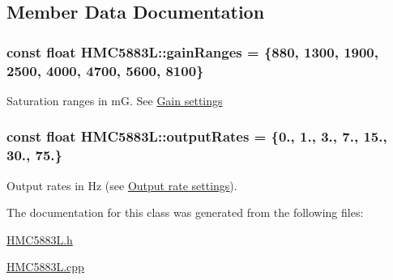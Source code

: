 \subsection{Member Data Documentation}
\hypertarget{class_h_m_c5883_l_a631541baef14a0c965430a685ca14504}{
\subsubsection[{gain\+Ranges}]{\setlength{\rightskip}{0pt plus 5cm}const float H\+M\+C5883\+L\+::gain\+Ranges = \{880, 1300, 1900, 2500, 4000, 4700, 5600, 8100\}\hspace{0.3cm}{\ttfamily [static]}}}\label{class_h_m_c5883_l_a631541baef14a0c965430a685ca14504}
Saturation ranges in m\+G. See \hyperlink{group___gain_settings}{Gain settings} \hypertarget{class_h_m_c5883_l_ab3b98b1bbed0b767df657ce0a6630adc}{
\subsubsection[{output\+Rates}]{\setlength{\rightskip}{0pt plus 5cm}const float H\+M\+C5883\+L\+::output\+Rates = \{0., 1., 3., 7., 15., 30., 75.\}\hspace{0.3cm}{\ttfamily [static]}}}\label{class_h_m_c5883_l_ab3b98b1bbed0b767df657ce0a6630adc}
Output rates in Hz (see \hyperlink{group___output_rates}{Output rate settings}). 

The documentation for this class was generated from the following files\+:\begin{DoxyCompactItemize}
\item 
\hyperlink{_h_m_c5883_l_8h}{H\+M\+C5883\+L.\+h}\item 
\hyperlink{_h_m_c5883_l_8cpp}{H\+M\+C5883\+L.\+cpp}\end{DoxyCompactItemize}
